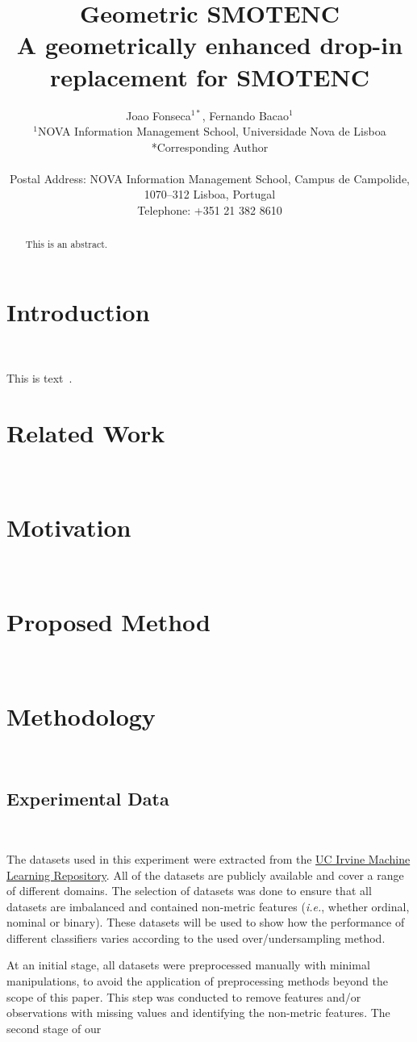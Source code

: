 \documentclass[parskip=full]{scrartcl}
\title{Geometric SMOTENC \\ \LARGE{A geometrically enhanced drop-in
replacement for SMOTENC}}
\author{%
	Joao Fonseca\(^{1*}\), Fernando Bacao\(^{1}\)
	\\
	\small{\(^{1}\)NOVA Information Management School, Universidade Nova de Lisboa}
	\\
	\small{*Corresponding Author}
	\\
	\\
	\small{Postal Address: NOVA Information Management School, Campus de
    Campolide, 1070--312 Lisboa, Portugal}
	\\
	\small{Telephone: +351 21 382 8610}
}
\date{}
\begin{document}
\maketitle

\begin{abstract}
    This is an abstract.
\end{abstract}

\section{Introduction}~\label{sec:introduction}

This is text~\cite{Chawla2002}.

\section{Related Work}~\label{sec:related_work}

\section{Motivation}~\label{sec:motivation}

\section{Proposed Method}~\label{sec:proposed_method}

\section{Methodology}~\label{sec:methodology}

\subsection{Experimental Data}~\label{sec:experimental_data}

The datasets used in this experiment were extracted from the
\href{https://archive.ics.uci.edu}{UC Irvine Machine Learning Repository}. All
of the datasets are publicly available and cover a range of different domains.
The selection of datasets was done to ensure that all datasets are imbalanced
and contained non-metric features (\textit{i.e.}, whether ordinal, nominal or
binary). These datasets will be used to show how the performance of different
classifiers varies according to the used over/undersampling method.

At an initial stage, all datasets were preprocessed manually with minimal
manipulations, to avoid the application of preprocessing methods beyond the
scope of this paper. This step was conducted to remove features and/or
observations with missing values and identifying the non-metric features. The
second stage of our
\end{document}
